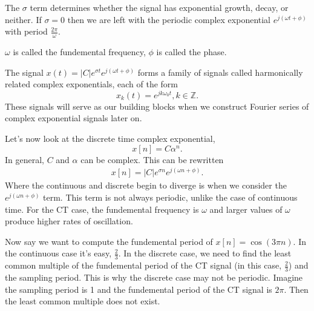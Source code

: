 The $\sigma$ term determines whether the signal has exponential 
growth, decay, or neither. If $\sigma = 0$ then we are left 
with the periodic complex exponential $e^{j(\omega t + \phi)}$ 
with period $\frac{2\pi}{\omega}$. 

$\omega$ is called the fundemental frequency, 
$\phi$ is called the phase. 

The signal $x(t) = |C|e^{\sigma t}e^{j(\omega t + \phi)}$
forms a family of signals called harmonically 
related complex exponentials, each of the 
form 
\begin{equation}
    x_k(t) = e^{jk\omega_0 t}, k \in \mathbb{Z}.
\end{equation}
These signals will serve as our building 
blocks when we construct Fourier series 
of complex exponential signals later on. 

Let's now look at the discrete time 
complex exponential,
\begin{equation}
    x[n] = C \alpha^n.
\end{equation}
In general, $C$ and $\alpha$ can be complex. 
This can be rewritten 
\begin{eqnarray}
    x[n] = |C|e^{\sigma n} e^{j(\omega n + \phi)}. 
\end{eqnarray}
Where the continuous and discrete begin 
to diverge is when we consider the 
$e^{j(\omega n + \phi)}$ term. This 
term is not always periodic, unlike 
the case of continuous time. For 
the CT case, the fundemental 
frequency is $\omega$ and larger 
values of $\omega$ produce 
higher rates of oscillation. 

Now say we want to compute the 
fundemental period of $x[n] = \cos(3\pi n)$. 
In the continuous case it's easy, $\frac{2}{3}$.
In the discrete case, we need to 
find the least common multiple 
of the fundemental period 
of the CT signal (in this case, 
$\frac{2}{3}$) and the sampling 
period. This is why the 
discrete case may not be periodic.
Imagine the sampling period is 1
and the fundemental period of the 
CT signal is $2 \pi$. Then the 
least common multiple does not 
exist. 